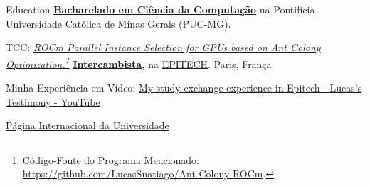 \begin{rubric}{Education}
\entry*[2019 -- 2023]%
    \textbf{\href{https://drive.google.com/file/d/1c2m8jONNZnZUBY8lnjcAZ_gO1ZWcIsyu/view?usp=sharing}{Bacharelado em Ciência da Computação}} na Pontifícia Universidade Católica de Minas Gerais (PUC-MG).
    \par TCC: \emph{\href{https://media.githubusercontent.com/media/LucasSnatiago/TCC/main/main.pdf}
    {ROCm Parallel Instance Selection for GPUs based on Ant Colony Optimization.}\footnote{Código-Fonte do Programa Mencionado: \href{https://github.com/LucasSnatiago/Ant-Colony-ROCm}{https://github.com/LucasSnatiago/Ant-Colony-ROCm}.}}
%
\entry*[2023/1]%
    \textbf{\href{https://drive.google.com/file/d/18yGVDfS8qOwmM7TXN-m8jqI3r0iMvm-3/view?usp=sharing}{Intercambista},} na \href{https://epitech.eu/}{EPITECH}. Paris, França. \par
    Minha Experiência em Vídeo: \href{https://youtu.be/rOP5lxGcNaE}{My study exchange experience in Epitech - Lucas's Testimony - YouTube} \par
    \href{https://web.archive.org/web/20250407145959/https://international.epitech.eu/}{Página Internacional da Universidade}
%
\end{rubric}
